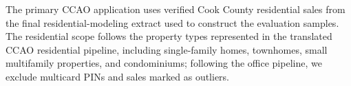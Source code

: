 \documentclass[10pt]{article}
\theoremstyle{definition}
\newcommand{\1}{\mathbf{1}}
\newcommand{\oldtext}[1]{\textcolor{blue}{\sout{#1}}}
\newcommand{\newtext}[1]{\textcolor{impGreen}{#1}}
\begin{document}

\newtext{The primary CCAO application uses verified Cook County residential sales from the final residential-modeling extract used to construct the evaluation samples. The residential scope follows the property types represented in the translated CCAO residential pipeline, including single-family homes, townhomes, small multifamily properties, and condominiums; following the office pipeline, we exclude multicard PINs and sales marked as outliers.}

\end{document}
